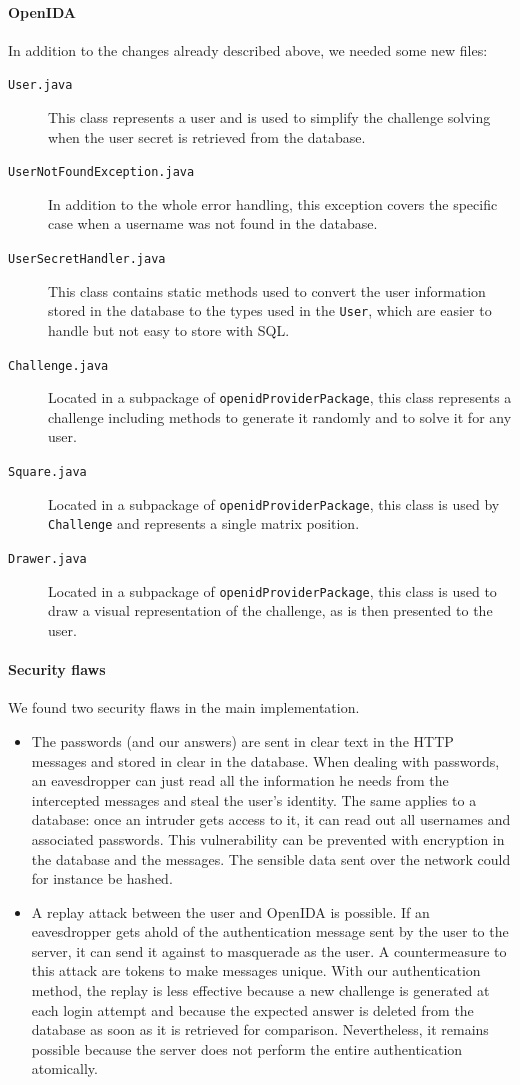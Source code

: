 \documentclass[11pt,a4paper]{article}
\begin{document}
\paragraph{OpenIDA}
In addition to the changes already described above, we needed some new files:
\begin{description}
\item[\texttt{User.java}] This class represents a user and is used to simplify the challenge solving when the user secret is retrieved from the database.
\item[\texttt{UserNotFoundException.java}] In addition to the whole error handling, this exception covers the specific case when a username was not found in the database.
\item[\texttt{UserSecretHandler.java}] This class contains static methods used to convert the user information stored in the database to the types used in the \texttt{User}, which are easier to handle but not easy to store with SQL.
\item[\texttt{Challenge.java}] Located in a subpackage of \texttt{openidProviderPackage}, this class represents a challenge including methods to generate it randomly and to solve it for any user.
\item[\texttt{Square.java}] Located in a subpackage of \texttt{openidProviderPackage}, this class is used by
\texttt{Challenge} and represents a single matrix position.
\item[\texttt{Drawer.java}] Located in a subpackage of \texttt{openidProviderPackage}, this class is used to draw a visual representation of the challenge, as is then presented to the user.

\end{description}

\paragraph{Security flaws}
We found two security flaws in the main implementation.
\begin{itemize}
\item The passwords (and our answers) are sent in clear text in the HTTP messages and stored in clear in the database. When dealing with passwords, an eavesdropper can just read all the information he needs from the intercepted messages and steal the user's identity. The same applies to a database: once an intruder gets access to it, it can read out all usernames and associated passwords. This vulnerability can be prevented with encryption in the database and the messages. The sensible data sent over the network could for instance be hashed.
\item A replay attack between the user and OpenIDA is possible. If an eavesdropper gets ahold of the authentication message sent by the user to the server, it can send it against to masquerade as the user. A countermeasure to this attack are tokens to make messages unique. With our authentication method, the replay is less effective because a new challenge is generated at each login attempt and because the expected answer is deleted from the database as soon as it is retrieved for comparison. Nevertheless, it remains possible because the server does not perform the entire authentication atomically.
\end{itemize}
\end{document}
